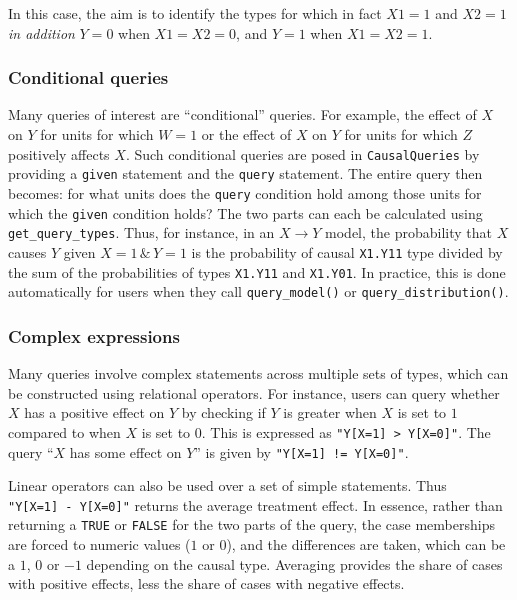 \documentclass[
  11pt,
  article]{jss}
\begin{document}
In this case, the aim is to identify the types for which in fact
\(X1=1\) and \(X2=1\) \emph{in addition} \(Y=0\) when \(X1 = X2 = 0\),
and \(Y = 1\) when \(X1 = X2 = 1\).

\subsubsection{Conditional queries}\label{conditional-queries}

Many queries of interest are ``conditional'' queries. For example, the
effect of \(X\) on \(Y\) for units for which \(W=1\) or the effect of
\(X\) on \(Y\) for units for which \(Z\) positively affects \(X\). Such
conditional queries are posed in \texttt{CausalQueries} by providing a
\texttt{given} statement and the \texttt{query} statement. The entire
query then becomes: for what units does the \texttt{query} condition
hold among those units for which the \texttt{given} condition holds? The
two parts can each be calculated using \texttt{get\_query\_types}. Thus,
for instance, in an \(X \rightarrow Y\) model, the probability that
\(X\) causes \(Y\) given \(X=1 \, \& \, Y=1\) is the probability of
causal \texttt{X1.Y11} type divided by the sum of the probabilities of
types \texttt{X1.Y11} and \texttt{X1.Y01}. In practice, this is done
automatically for users when they call \texttt{query\_model()} or
\texttt{query\_distribution()}.

\subsubsection{Complex expressions}\label{complex-expressions}

Many queries involve complex statements across multiple sets of types,
which can be constructed using relational operators. For instance, users
can query whether \(X\) has a positive effect on \(Y\) by checking if
\(Y\) is greater when \(X\) is set to \(1\) compared to when \(X\) is
set to \(0\). This is expressed as
\texttt{"Y{[}X=1{]}\ \textgreater{}\ Y{[}X=0{]}"}. The query ``\(X\) has
some effect on \(Y\)'' is given by
\texttt{"Y{[}X=1{]}\ !=\ Y{[}X=0{]}"}.

Linear operators can also be used over a set of simple statements. Thus
\texttt{"Y{[}X=1{]}\ -\ Y{[}X=0{]}"} returns the average treatment
effect. In essence, rather than returning a \texttt{TRUE} or
\texttt{FALSE} for the two parts of the query, the case memberships are
forced to numeric values (\(1\) or \(0\)), and the differences are
taken, which can be a \(1\), \(0\) or \(-1\) depending on the causal
type. Averaging provides the share of cases with positive effects, less
the share of cases with negative effects.
\end{document}
